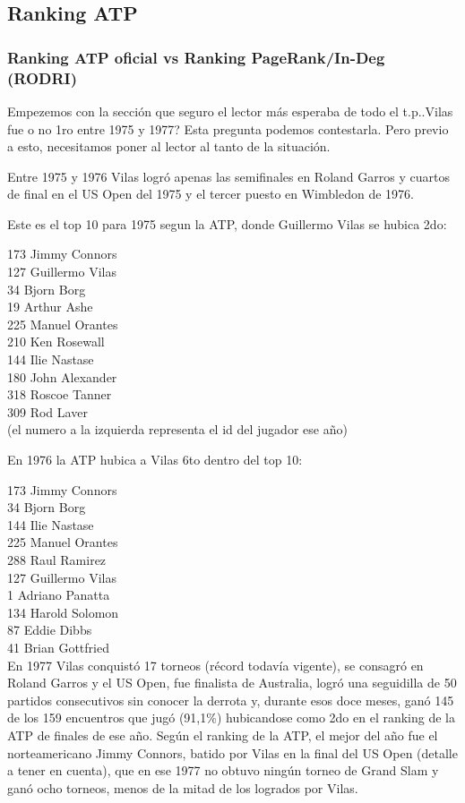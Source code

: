 \subsection{Ranking ATP}

\subsubsection{Ranking ATP oficial vs Ranking PageRank/In-Deg (RODRI)}

Empezemos con la sección que seguro el lector más esperaba de todo el t.p..Vilas fue o no 1ro entre 1975 y 1977? Esta pregunta podemos contestarla. Pero previo a esto, necesitamos poner al lector al tanto de la situación.


Entre 1975 y 1976 Vilas logró apenas las semifinales en Roland Garros y cuartos de final en el US Open del 1975 y el tercer puesto en Wimbledon de 1976.


Este es el top 10 para 1975 segun la ATP, donde Guillermo Vilas se hubica 2do: 


173 Jimmy Connors \\
127 Guillermo Vilas \\
34 Bjorn Borg \\
19 Arthur Ashe \\
225 Manuel Orantes \\
210 Ken Rosewall \\
144 Ilie Nastase \\
180 John Alexander \\
318 Roscoe Tanner \\
309 Rod Laver \\


(el numero a la izquierda representa el id del jugador ese año)


En 1976 la ATP hubica a Vilas 6to dentro del top 10:


173 Jimmy Connors \\
34 Bjorn Borg \\
144 Ilie Nastase \\
225 Manuel Orantes \\
288 Raul Ramirez \\
127 Guillermo Vilas \\
1 Adriano Panatta \\
134 Harold Solomon \\
87 Eddie Dibbs \\
41 Brian Gottfried \\


En 1977 Vilas conquistó 17 torneos (récord todavía vigente), se consagró en Roland Garros y el US Open, fue finalista de Australia, logró una seguidilla de 50 partidos consecutivos sin conocer la derrota y, durante esos doce meses, ganó 145 de los 159 encuentros que jugó (91,1\%) hubicandose como 2do en el ranking de la ATP de finales de ese año.
Según el ranking de la ATP, el mejor del año fue el norteamericano Jimmy Connors, batido por Vilas en la final del US Open (detalle a tener en cuenta), que en ese 1977 no obtuvo ningún torneo de Grand Slam y ganó ocho torneos, menos de la mitad de los logrados por Vilas.  


